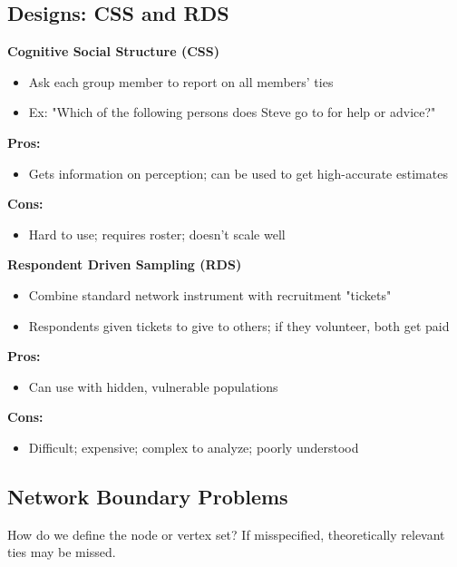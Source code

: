 \documentclass[]{book}
\theoremstyle{definition}
\theoremstyle{definition}
\theoremstyle{definition}
\theoremstyle{remark}
\begin{document}
\subsection{Designs: CSS and RDS}\begin{multicols}{2}
\noindent
\textbf{Cognitive Social Structure (CSS)}
\begin{itemize} 
\item Ask each group member to 
report on all members' ties 
\item Ex: "Which of the following 
persons does Steve go to for 
help or advice?" 
\end{itemize}

\noindent
\textbf{Pros:}
\begin{itemize} 
\item Gets information on 
perception; can be used to get 
high-accurate estimates 
\end{itemize}

\noindent
\textbf{Cons:}
\begin{itemize} 
\item Hard to use; requires roster; 
doesn't scale well 
\end{itemize}

\noindent
\textbf{Respondent Driven Sampling (RDS) }
\begin{itemize}
\item Combine standard network 
instrument with recruitment 
"tickets" 
\item Respondents given tickets to 
give to others; if they 
volunteer, both get paid 
\end{itemize}

\noindent
\textbf{Pros:}
\begin{itemize} 
\item Can use with hidden, 
vulnerable populations 
\end{itemize}

\textbf{Cons:} 
\begin{itemize}
\item Difficult; expensive; complex 
to analyze; poorly understood
\end{itemize}
\end{multicols}

\subsection{Network Boundary Problems}

How do we define the node or vertex set? If misspecified, theoretically
relevant ties may be missed.
\end{document}
